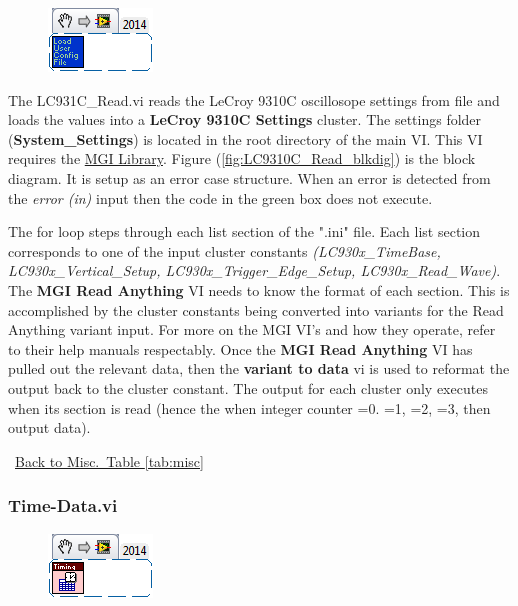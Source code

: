 \documentclass[11pt,a4paper,oldfontcommands]{memoir}
\begin{document}
\begin{figure}[h]
	\includegraphics[scale=0.625]{Load-User-Config-File_main_01}
	\label{fig:Load-User-Config-File_main_01}
\end{figure}

The LC931C\_Read.vi reads the LeCroy 9310C oscillosope settings from file and loads the values into a \textbf{LeCroy 9310C Settings} cluster. The settings folder (\textbf{System\_Settings}) is located in the root directory of the main VI. This VI requires the \href{http://sine.ni.com/nips/cds/view/p/lang/en/nid/209753}{MGI Library}. Figure (\ref{fig:LC9310C_Read_blkdig}) is the block diagram.  It is setup as an error case structure. When an error is detected from the \textit{error (in)} input then the code in the green box does not execute.

The for loop steps through each list section of the ".ini" file. Each list section corresponds to one of the input cluster constants \textit{(LC930x\_TimeBase, LC930x\_Vertical\_Setup, LC930x\_Trigger\_Edge\_Setup, LC930x\_Read\_Wave)}. The \textbf{MGI Read Anything} VI needs to know the format of each section. This is accomplished by the cluster constants being converted into variants for the Read Anything variant input.  For more on the MGI VI's and how they operate, refer to their help manuals respectably. Once the \textbf{MGI Read Anything} VI has pulled out the relevant data, then the \textbf{variant to data} vi is used to reformat the output back to the cluster constant. The output for each cluster only executes when its section is read (hence the when integer counter =0. =1, =2, =3, then output data).

\noindent\hrulefill\, \hyperref[tab:misc]{Back to Misc.\ Table \ref{tab:misc}}

\subsubsection{Time-Data.vi} \label{Time-Data}
\noindent\hrulefill

\begin{figure}[h]
	\includegraphics[scale=0.625]{Time-Data_main_01}
	\label{fig:Time-Data_main_01}
\end{figure}
\end{document}
